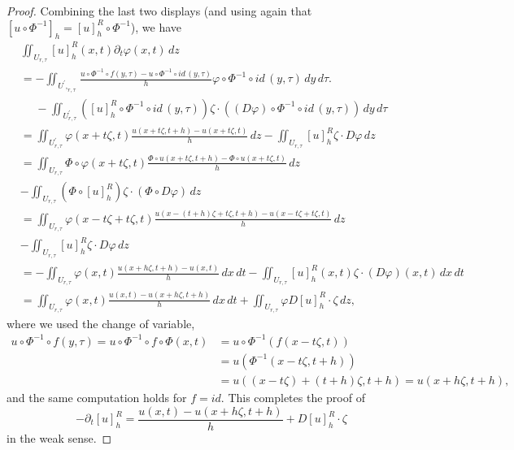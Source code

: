 \documentclass[10pt,a4paper]{amsart}
\numberwithin{equation}{section}
\begin{document}
\begin{proof}
Combining the last two displays (and using again that $[u\circ\Phi^{-1}]_{h}=[u]_{h}^{R}\circ\Phi^{-1}$),
we have
\begin{align*}
&\iint_{U_{r, \tau}}[u]_{h}^{R}(x, t)\partial_{t}\varphi(x, t)\,dz\\
& =-\iint_{U^{\prime}, _{r, \tau}}\frac{u\circ\Phi^{-1}\circ f(y,\tau)-u\circ\Phi^{-1}\circ id\, (y,\tau)}{h}\varphi\circ\Phi^{-1}\circ id\, (y,\tau)\,dy\,d\tau.\\
 & \phantom{=}-\iint_{U^{\prime}_{r, \tau}}([u]_{h}^{R}\circ\Phi^{-1}\circ id\,(y, \tau))\zeta\cdot((D\varphi)\circ\Phi^{-1}\circ id\, (y, \tau))\,dy\, d\tau\\
&=\iint_{U^{\prime}_{r, \tau}}\varphi(x+t\zeta, t)\frac{u(x+t\zeta, t+h)-u(x+t\zeta, t)}{h}\, dz-\iint_{U_{r, \tau}}[u]^{R}_h \zeta\cdot D\varphi\, dz\\
&=\iint_{U_{r, \tau}}\Phi\circ \varphi(x+t \zeta, t)\frac{\Phi \circ u(x+t\zeta, t+h)-\Phi \circ u(x+t\zeta, t)}{h}\, dz\\
&-\iint_{U_{r, \tau}}(\Phi \circ [u]^{R}_h) \zeta\cdot (\Phi \circ D\varphi)\, dz\\
&=\iint_{U_{r, \tau}}\varphi(x-t\zeta +t\zeta, t)\frac{u(x-(t+h)\zeta+t\zeta, t+h)-u(x-t\zeta +t\zeta, t)}{h}\, dz\\
&-\iint_{U_{r, \tau}}[u]^{R}_h \zeta\cdot D\varphi\, dz \\
 & =-\iint_{U_{r, \tau}}\varphi(x,t)\frac{ u(x+h \zeta,t+h)- u(x,t)}{h}\,dx\, dt-\iint_{U_{r, \tau}}[u]_{h}^{R}(x, t)\zeta\cdot (D\varphi)(x, t)\, dx \, dt\\
 & =\iint_{U_{r, \tau}}\varphi(x,t)\frac{u(x,t)-u(x+h\zeta,t+h)}{h}\, dx\, dt+\iint_{U_{r, \tau}}\varphi D[u]_{h}^{R}\cdot\zeta\,dz,
\end{align*}
where we used the change of variable,
\begin{align*}
 u\circ\Phi^{-1}\circ f(y, \tau)=u\circ\Phi^{-1}\circ f\circ\Phi(x,t)&=u\circ\Phi^{-1}(f(x-t\zeta,t))\\
    &=u(\Phi^{-1}(x-t\zeta,t+h))\\
   &=u((x-t\zeta)+(t+h)\zeta,t+h)  =u(x+h\zeta, t+h),   
\end{align*}
and the same computation holds for $f=id.$
This completes the proof of $$-\partial_{t}[u]^{R}_h=\frac{u(x,t)-u(x+h \zeta,t+h)}{h}+D[u]_{h}^{R}\cdot\zeta$$
in the weak sense.
\end{proof}
\end{document}
